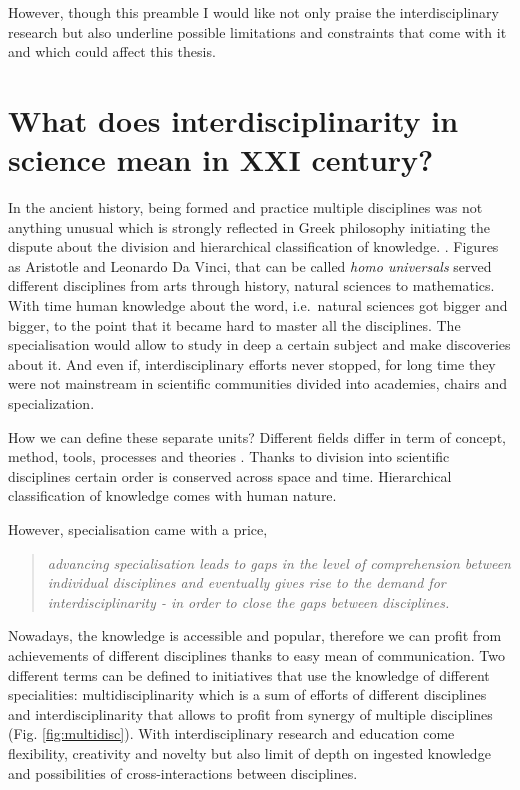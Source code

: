 \documentclass[12pt,]{book}
\theoremstyle{definition}
\theoremstyle{definition}
\theoremstyle{definition}
\theoremstyle{remark}
\begin{document}
However, though this preamble I would like not only praise the
interdisciplinary research but also underline possible limitations and
constraints that come with it and which could affect this thesis.

\hypertarget{what-does-interdisciplinarity-in-science-mean-in-xxi-century}{%
\section*{What does interdisciplinarity in science mean in XXI
century?}\label{what-does-interdisciplinarity-in-science-mean-in-xxi-century}}

In the ancient history, being formed and practice multiple disciplines
was not anything unusual which is strongly reflected in Greek philosophy
initiating the dispute about the division and hierarchical
classification of knowledge. \citep{Slavicek2012}. Figures as Aristotle
and Leonardo Da Vinci, that can be called \emph{homo universals} served
different disciplines from arts through history, natural sciences to
mathematics. With time human knowledge about the word, i.e.~natural
sciences got bigger and bigger, to the point that it became hard to
master all the disciplines. The specialisation would allow to study in
deep a certain subject and make discoveries about it. And even if,
interdisciplinary efforts never stopped, for long time they were not
mainstream in scientific communities divided into academies, chairs and
specialization.

How we can define these separate units? Different fields differ in term
of concept, method, tools, processes and theories \citep{Slavicek2012}.
Thanks to division into scientific disciplines certain order is
conserved across space and time. Hierarchical classification of
knowledge comes with human nature.

However, specialisation came with a price,

\begin{quote}
\emph{advancing specialisation leads to gaps in the level of
comprehension between individual disciplines and eventually gives rise
to the demand for interdisciplinarity - in order to close the gaps
between disciplines.}\citep{Slavicek2012}
\end{quote}

Nowadays, the knowledge is accessible and popular, therefore we can
profit from achievements of different disciplines thanks to easy mean of
communication. Two different terms can be defined to initiatives that
use the knowledge of different specialities: multidisciplinarity which
is a sum of efforts of different disciplines and interdisciplinarity
that allows to profit from synergy of multiple disciplines (Fig.
\ref{fig:multidisc}). With interdisciplinary research and education come
flexibility, creativity and novelty but also limit of depth on ingested
knowledge and possibilities of cross-interactions between disciplines.
\end{document}
